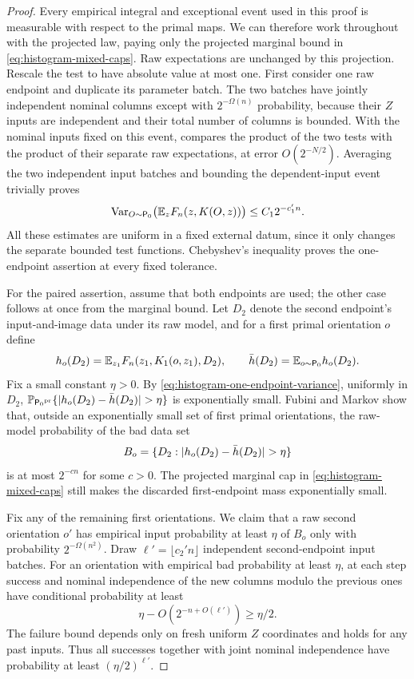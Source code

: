 \begin{proof}
Every empirical integral and exceptional event used in this proof
is measurable with respect to the primal maps.  We can therefore
work throughout with the projected law, paying only the projected
marginal bound in \eqref{eq:histogram-mixed-caps}.  Raw expectations
are unchanged by this projection.  Rescale the test to have absolute
value at most one. First consider
one raw endpoint and duplicate its parameter batch. The two batches
have jointly independent nominal columns except with
$2^{-\Omega(n)}$ probability, because their $Z$ inputs are independent
and their total number of columns is bounded. With the nominal inputs
fixed on this event,  compares the
product of the two tests with the product of their separate raw
expectations, at error $O(2^{-N/2})$. Averaging the two independent
input batches and bounding the dependent-input event trivially proves
\begin{equation}\label{eq:histogram-one-endpoint-variance}
 \operatorname{Var}_{O\sim{\mathsf P_0}}\bigl(\mathbb E_zF_n(z,K(O,z))\bigr)
 \le C_1 2^{-c_1'n}.
\end{equation}
All these estimates are uniform in a fixed external datum, since it
only changes the separate bounded test functions. Chebyshev's
inequality proves the one-endpoint assertion at every fixed
tolerance.

For the paired assertion, assume that both endpoints are used; the
other case follows at once from the marginal bound. Let $D_2$ denote
the second endpoint's input-and-image data under its raw model, and
for a first primal orientation $o$ define
\[
 h_o(D_2)=\mathbb E_{z_1}F_n(z_1,K_1(o,z_1),D_2),\qquad
 \bar h(D_2)=\mathbb E_{o\sim{\mathsf P_0}}h_o(D_2).
\]
Fix a small constant $\eta>0$. By
\eqref{eq:histogram-one-endpoint-variance}, uniformly in $D_2$,
$\mathbb P_{{\mathsf P_0}^{\mathrm{pr}}}\{\lvert h_o(D_2)-\bar h(D_2)\rvert>\eta\}$ is exponentially
small. Fubini and Markov show that, outside an exponentially small
set of first primal orientations, the raw-model probability of the bad data
set
\[
 B_o=\{D_2:\lvert h_o(D_2)-\bar h(D_2)\rvert>\eta\}
\]
is at most $2^{-c n}$ for some $c>0$. The projected marginal cap in
\eqref{eq:histogram-mixed-caps} still makes the discarded
first-endpoint mass exponentially small.

Fix any of the remaining first orientations. We claim that a raw
second orientation $o'$ has empirical input probability at least
$\eta$ of $B_o$ only with probability $2^{-\Omega(n^2)}$. Draw
$\ell'=\lfloor c_2'n\rfloor$ independent second-endpoint input
batches. For an orientation with empirical bad probability at least
$\eta$, at each step success and nominal independence of the new
columns modulo the previous ones have conditional probability at
least
\[
 \eta-O(2^{-n+O(\ell')})\ge\eta/2.
\]
The failure bound depends only on fresh uniform $Z$ coordinates and
holds for any past inputs. Thus all successes together with joint
nominal independence have probability at least $(\eta/2)^{\ell'}$.


\end{proof}
